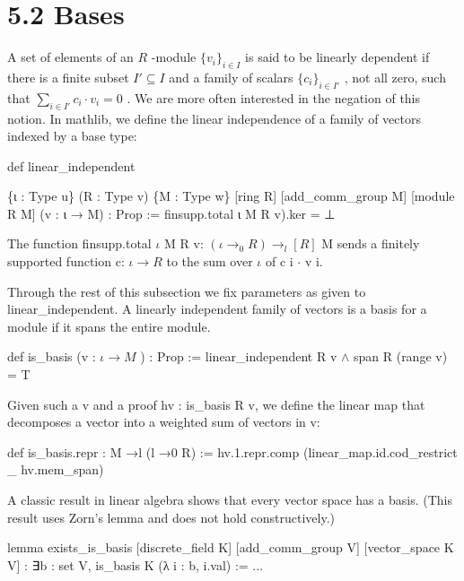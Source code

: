 \documentclass[
]{article}
\newenvironment{Shaded}{}{}
\newcommand{\NormalTok}[1]{#1}
\begin{document}
\section{5.2 Bases}\label{bases}

A set of elements of an \(R\) -module \(\{v_i\}_{i \in I}\) is said to
be linearly dependent if there is a finite subset \(I' \subseteq I\) and
a family of scalars \(\{c_i\}_{i \in I'}\) , not all zero, such that
\(\sum_{i \in I'} c_i \cdot v_i = 0\) . We are more often interested in
the negation of this notion. In mathlib, we define the linear
independence of a family of vectors indexed by a base type:

def linear\_independent

\begin{Shaded}
\begin{Highlighting}[]
\NormalTok{\{ι : Type u\} (R : Type v) \{M : Type w\}}
\NormalTok{[ring R] [add\_comm\_group M] [module R M]}
\NormalTok{(v : ι → M) : Prop :=}
\NormalTok{finsupp.total ι M R v).ker = ⊥ }
\end{Highlighting}
\end{Shaded}

The function finsupp.total \(\iota\) M R v:
\((\iota \to_{0} R) \to_{l}[R]\) M sends a finitely supported function
c: \(\iota \to R\) to the sum over \(\iota\) of c i \(\cdot\) v i.

Through the rest of this subsection we fix parameters as given to
linear\_independent. A linearly independent family of vectors is a basis
for a module if it spans the entire module.

def is\_basis (v : \(\iota \rightarrow M\) ) : Prop :=
linear\_independent R v \(\wedge\) span R (range v) = T

Given such a v and a proof hv : is\_basis R v, we define the linear map
that decomposes a vector into a weighted sum of vectors in v:

\begin{Shaded}
\begin{Highlighting}[]
\NormalTok{def is\_basis.repr : M →l (l →0 R) :=}
\NormalTok{hv.1.repr.comp}
\NormalTok{(linear\_map.id.cod\_restrict \_ hv.mem\_span) }
\end{Highlighting}
\end{Shaded}

A classic result in linear algebra shows that every vector space has a
basis. (This result uses Zorn's lemma and does not hold constructively.)

\begin{Shaded}
\begin{Highlighting}[]
\NormalTok{lemma exists\_is\_basis [discrete\_field K]}
\NormalTok{[add\_comm\_group V] [vector\_space K V] :}
\NormalTok{∃b : set V, is\_basis K (λ i : b, i.val) := ... }
\end{Highlighting}
\end{Shaded}
\end{document}
